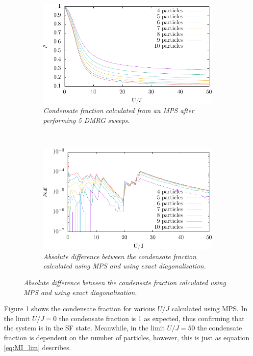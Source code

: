 \begin{figure}[h!]
    \centering
    \begin{subfigure}[t]{0.49\textwidth}
        \includegraphics[width=\textwidth]{Figures/Condfrac_4to10.pdf}
        \caption{\textit{Condensate fraction calculated from an MPS after performing 5 DMRG sweeps.}}
        \label{fig:Condfrac_4to10}
    \end{subfigure}
    ~
    \begin{subfigure}[t]{0.49\textwidth}
        \includegraphics[width=\textwidth]{Figures/Confrac_exactvsMPS.pdf}
        \caption{\textit{Absolute difference between the condensate fraction calculated using MPS and using exact diagonalisation.}}
        \label{fig:Condfrac_exactvsMPS}
    \end{subfigure}    
\end{figure}
Figure \ref{fig:Condfrac_4to10} shows the condensate fraction for various $U/J$ calculated using MPS. In the limit $U/J = 0$ the condensate fraction is 1 as expected, thus confirming that the system is in the SF state. Meanwhile, in the limit $U/J = 50$ the condensate fraction is dependent on the number of particles, however, this is just as equation \ref{eq:MI_lim} describes.\\
